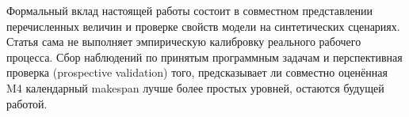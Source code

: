 Формальный вклад настоящей работы состоит в совместном представлении перечисленных величин и проверке свойств модели на синтетических сценариях. Статья сама не выполняет эмпирическую калибровку реального рабочего процесса. Сбор наблюдений по принятым программным задачам и перспективная проверка (prospective validation) того, предсказывает ли совместно оценённая M4 календарный makespan лучше более простых уровней, остаются будущей работой.


\FloatBarrier
